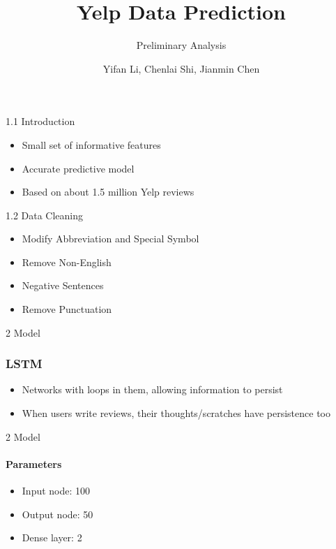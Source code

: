 \documentclass[10pt]{beamer}
\title{Yelp Data Prediction}
\subtitle{Preliminary Analysis}
\date{}
\author{Yifan Li, Chenlai Shi, Jianmin Chen}
\institute{Monday Group 1}
\begin{document}
\maketitle



\begin{frame}{1.1 Introduction}
\begin{itemize}
	\item Small set of informative features
	\item Accurate predictive model
	\item Based on about 1.5 million Yelp reviews
\end{itemize}
\end{frame}



\begin{frame}{1.2 Data Cleaning}


\begin{itemize}

	\item[1] Modify Abbreviation and Special Symbol

	\item[2] Remove Non-English

	\item[3] Negative Sentences
	
	\item[4] Remove Punctuation

\end{itemize}

\end{frame}
\begin{frame}{2 Model}
\frametitle{LSTM}
\begin{itemize}
	\item Networks with loops in them, allowing information to persist
	\item When users write reviews, their thoughts/scratches have persistence too
\end{itemize}

\end{frame}

\begin{frame}{2 Model}
\framesubtitle{Parameters}
\begin{itemize}
	\item Input node: 100
	\item Output node: 50
	\item Dense layer: 2
\end{itemize}
\end{frame}
\end{document}
